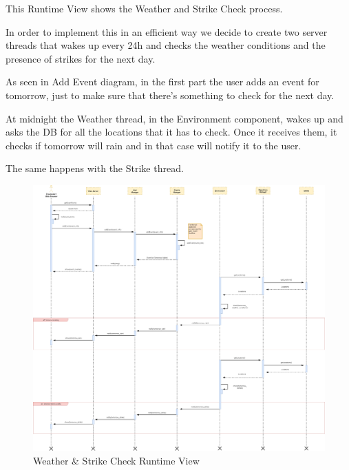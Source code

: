 \newpage
{}
This Runtime View shows the Weather and Strike Check process.\par
In order to implement this in an efficient way we decide to create two server threads that wakes up every 24h and checks the weather conditions and the presence of strikes for the next day.\par
As seen in Add Event diagram, in the first part the user adds an event for tomorrow, just to make sure that there’s something to check for the next day.\par
At midnight the Weather thread, in the Environment component, wakes up and asks the DB for all the locations that it has to check. Once it receives them, it checks if tomorrow will rain and in that case will notify it to the user.\par
The same happens with the Strike thread.
\begin{figure}[H]
	\centering
	\includegraphics[scale=0.165]{Images/Runtime/Weather_Strike_Check}
	\caption{Weather \& Strike Check Runtime View}
\end{figure}

